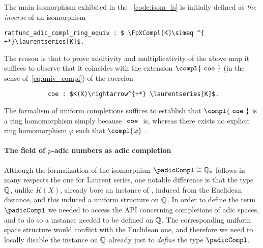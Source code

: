 \documentclass[sigplan,10pt,anonymous,review]{acmart}
\begin{document}
The main isomorphism  exhibited in the \LClistingname~\ref{code:isom_ls} is initially defined as \emph{the inverse} of an isomorphism\href{https://github.com/LCFT-Lean/local_fields/blob/76ad487d09babdb0018f394a5634526637ee014a/src/laurent_series_equiv_adic_completion.lean#L823}{\extlink}
\begin{lstlisting}
ratfunc_adic_compl_ring_equiv : $ \FpXCompl[K]\simeq ^{ +*}\laurentseries[K]$.
\end{lstlisting}
The reason is that to prove additivity and multiplicativity of the above map it suffices to observe that it coincides with the extension $\compl{\mcode{coe}}$ (in the sense of~\eqref{eq:univ_compl}) of the coercion
\begin{lstlisting}
            coe : $K(X)\rightarrow^{+*} \laurentseries[K]$.
\end{lstlisting}
The formalism of uniform completions suffices to establish that $\compl{\mcode{coe}}$ is a ring homomorphism simply because $\mathtt{\ coe\ }$ is, whereas there exists no explicit ring homomorphism $\varphi$ such that $\compl{\varphi}$ .
 
\paragraph{The field of $p$-adic numbers as adic completion}
Although the formalization of the isomorphism $\padicCompl\cong\QQ_p$ follows in many respects the one for Laurent series, one notable difference is that the type $\mathbb{Q}$, unlike $K(X)$, already bore an instance of , induced from the Euclidean distance, and this induced a uniform structure on $\mathbb{Q}$. In order to define the term $\padicCompl$ we needed to access the API concerning completions of adic spaces, and to do so a  instance needed to be defined on $\mathbb{Q}$. The corresponding uniform space structure would conflict with the Euclidean one, and therefore we need to locally disable the  instance on $\mathbb{Q}$ already just to \emph{define} the type $\padicCompl$.


\begin{acks}

\end{acks}





\end{document}
